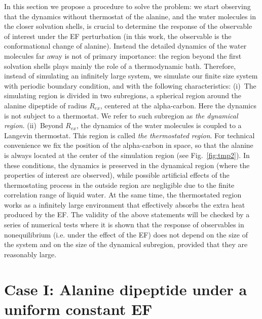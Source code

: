 \documentclass[a4paper,preprint,unsortedaddress,onecolumn]{revtex4-1}
\begin{document}
In this section we propose a procedure to solve the problem: we
start observing that the dynamics without thermostat of the alanine, 
and the water molecules in the closer solvation shells, is
crucial to determine the response of the observable of interest
under the EF perturbation
(in this work, the observable is the conformational change of alanine).
Instead the detailed dynamics of
the water molecules far away is not of primary importance: the region beyond the first solvation shells plays mainly the role of a thermodynamic bath. 
Therefore, instead of simulating an infinitely
large system, we simulate our finite size system with periodic
boundary condition, and with the following characteristics:
(i)~The simulating region is divided in two
subregions, a spherical region around the alanine dipeptide of radius $R_{ex}$,
centered at the alpha-carbon. Here the dynamics is
not subject to a thermostat.
We refer to such subregion as \emph{the  dynamical
region}. (ii)~Beyond $R_{ex}$, the dynamics of the water molecules is coupled
to a Langevin thermostat.  This region is called \emph{the thermostated
region}. For technical convenience we
fix the position of the alpha-carbon in space, so that the alanine is always
located at the center of the simulation region (see Fig.~\ref{fig:tmp2}).
In these conditions, the  dynamics is preserved in the dynamical region (where the properties of interest are observed), while 
possible artificial effects of the thermostating process in the outside region
are negligible due to the finite correlation
range of liquid water.
At the same time, the thermostated region works as a infinitely large
environment that effectively absorbs the extra heat produced by the EF.
The validity of the above
statements will be checked by a series of numerical tests where it is shown that
the response of observables in nonequilibrium (i.e. under the effect of the EF) does not depend on the size of the system
and on the size of the  dynamical subregion, provided that they are
reasonably large.

\section{Case I: Alanine dipeptide
  under a uniform  constant EF}
\end{document}
